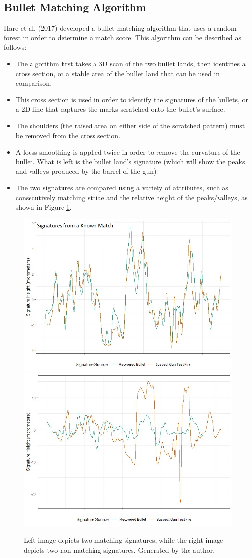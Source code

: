 \documentclass[print]{nuthesis}
\begin{document}
\hypertarget{bullet-matching-algorithm}{%
\subsection{Bullet Matching Algorithm}\label{bullet-matching-algorithm}}

Hare et al. (2017) developed a bullet matching algorithm that uses a random forest in order to determine a match score.
This algorithm can be described as follows:

\begin{itemize}
\item
  The algorithm first takes a 3D scan of the two bullet lands, then identifies a cross section, or a stable area of the bullet land that can be used in comparison.
\item
  This cross section is used in order to identify the signatures of the bullets, or a 2D line that captures the marks scratched onto the bullet's surface.
\item
  The shoulders (the raised area on either side of the scratched pattern) must be removed from the cross section.
\item
  A loess smoothing is applied twice in order to remove the curvature of the bullet.
  What is left is the bullet land's signature (which will show the peaks and valleys produced by the barrel of the gun).
\item
  The two signatures are compared using a variety of attributes, such as consecutively matching striae and the relative height of the peaks/valleys, as shown in Figure \ref{fig:signaturecompare}.
\end{itemize}

\begin{figure}

{\centering \includegraphics[width=0.49\linewidth]{images/Match_Signatures} \includegraphics[width=0.49\linewidth]{images/K995_NoMatch_Signatures} 

}

\caption{Left image depicts two matching signatures, while the right image depicts two non-matching signatures. Generated by the author.}\label{fig:signaturecompare}
\end{figure}
\end{document}
